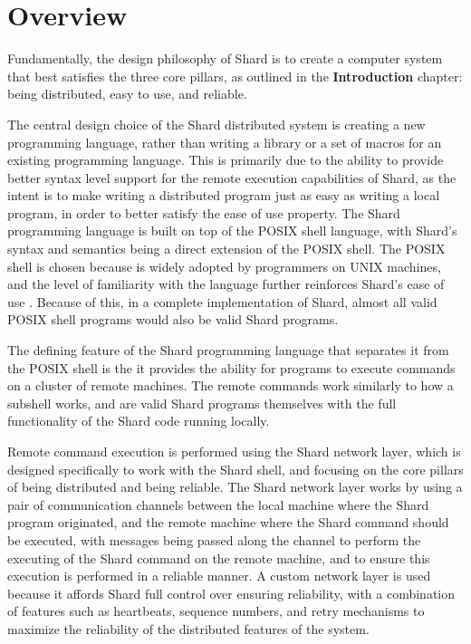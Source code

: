 \documentclass[oneside]{report}
\begin{document}
\section{Overview}

Fundamentally, the design philosophy of Shard is to create a computer system that best satisfies the three core pillars, as outlined in the \textbf{Introduction} chapter: being distributed, easy to use, and reliable.

The central design choice of the Shard distributed system is creating a new programming language, rather than writing a library or a set of macros for an existing programming language.
This is primarily due to the ability to provide better syntax level support for the remote execution capabilities of Shard, as the intent is to make writing a distributed program just as easy as writing a local program, in order to better satisfy the ease of use property.
The Shard programming language is built on top of the POSIX shell language, with Shard's syntax and semantics being a direct extension of the POSIX shell.
The POSIX shell is chosen because is widely adopted by programmers on UNIX machines, and the level of familiarity with the language further reinforces Shard's ease of use \cite{posix2017}.
Because of this, in a complete implementation of Shard, almost all valid POSIX shell programs would also be valid Shard programs.

The defining feature of the Shard programming language that separates it from the POSIX shell is the it provides the ability for programs to execute commands on a cluster of remote machines.
The remote commands work similarly to how a subshell works, and are valid Shard programs themselves with the full functionality of the Shard code running locally.

Remote command execution is performed using the Shard network layer, which is designed specifically to work with the Shard shell, and focusing on the core pillars of being distributed and being reliable.
The Shard network layer works by using a pair of communication channels between the local machine where the Shard program originated, and the remote machine where the Shard command should be executed, with messages being passed along the channel to perform the executing of the Shard command on the remote machine, and to ensure this execution is performed in a reliable manner.
A custom network layer is used because it affords Shard full control over ensuring reliability, with a combination of features such as heartbeats, sequence numbers, and retry mechanisms to maximize the reliability of the distributed features of the system.
\end{document}
